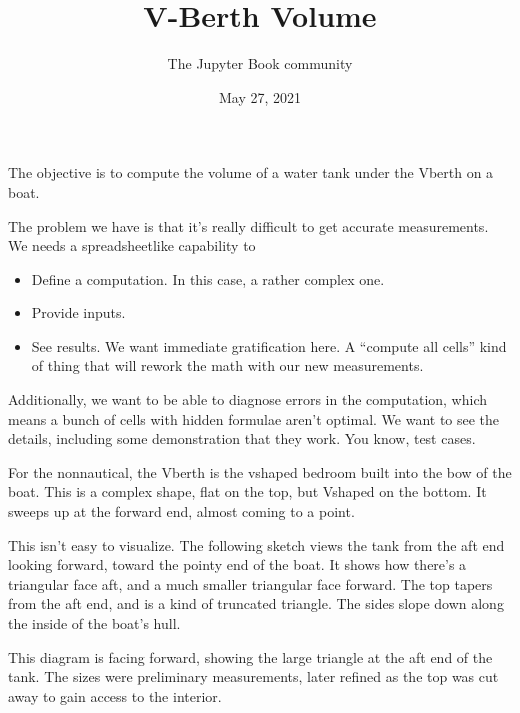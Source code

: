 \documentclass[letterpaper,10pt,english]{sphinxmanual}
\title{V-Berth Volume}
\date{May 27, 2021}
\author{The Jupyter Book community}
\begin{document}
\pagestyle{empty}
\sphinxmaketitle
\pagestyle{plain}
\sphinxtableofcontents
\pagestyle{normal}
\label{\detokenize{index::doc}}


\sphinxAtStartPar
The objective is to compute the volume of a water tank under the V\sphinxhyphen{}berth on a boat.

\sphinxAtStartPar
The problem we have is that it’s really difficult to get accurate measurements.
We needs a spreadsheet\sphinxhyphen{}like capability to
\begin{itemize}
\item {} 
\sphinxAtStartPar
Define a computation. In this case, a rather complex one.

\item {} 
\sphinxAtStartPar
Provide inputs.

\item {} 
\sphinxAtStartPar
See results. We want immediate gratification here. A “compute all cells” kind of thing
that will rework the math with our new measurements.

\end{itemize}

\sphinxAtStartPar
Additionally, we want to be able to diagnose errors in the computation, which
means a bunch of cells with hidden formulae aren’t optimal. We want to see the
details, including some demonstration that they work. You know, test cases.

\sphinxAtStartPar
For the non\sphinxhyphen{}nautical, the V\sphinxhyphen{}berth is the v\sphinxhyphen{}shaped bedroom built into the bow of
the boat. This is a complex shape, flat on the top, but V\sphinxhyphen{}shaped on the bottom.
It sweeps up at the forward end, almost coming to a point.

\sphinxAtStartPar
This isn’t easy to visualize. The following sketch views the tank from the aft end
looking forward, toward the pointy end of the boat.
It shows how there’s a triangular face aft, and a much smaller triangular face forward.
The top tapers from the aft end, and is a kind of truncated triangle.
The sides slope down along the inside of the boat’s hull.

\sphinxAtStartPar
{}

\sphinxAtStartPar
This diagram is facing forward, showing the large triangle at the aft end of the tank.
The sizes were preliminary measurements, later refined as the top was cut away to gain
access to the interior.
\end{document}
